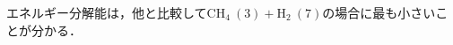 \documentclass[../master]{subfiles}
\begin{document}
エネルギー分解能は，他と比較して$\mathrm{CH}_{4}\ (3) + \mathrm{H}_{2}\ (7)$の場合に最も小さいことが分かる．
\end{document}
